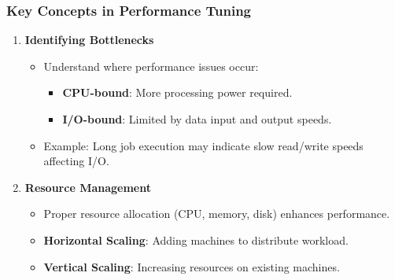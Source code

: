 \documentclass{beamer}
\begin{document}
\begin{frame}[fragile]
    \frametitle{Key Concepts in Performance Tuning}
    \begin{enumerate}
        \item \textbf{Identifying Bottlenecks}
        \begin{itemize}
            \item Understand where performance issues occur:
            \begin{itemize}
                \item \textbf{CPU-bound}: More processing power required.
                \item \textbf{I/O-bound}: Limited by data input and output speeds.
            \end{itemize}
            \item Example: Long job execution may indicate slow read/write speeds affecting I/O.
        \end{itemize}
        
        \item \textbf{Resource Management}
        \begin{itemize}
            \item Proper resource allocation (CPU, memory, disk) enhances performance.
            \item \textbf{Horizontal Scaling}: Adding machines to distribute workload.
            \item \textbf{Vertical Scaling}: Increasing resources on existing machines.
        \end{itemize}
    \end{enumerate}
\end{frame}
\end{document}
